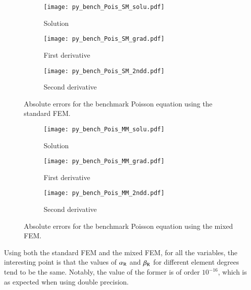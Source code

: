\documentclass[review,3p]{elsarticle}
\begin{document}
\begin{figure}[!ht]
    \begin{subfigure}{5.5cm}
        \texttt{[image: py\_bench\_Pois\_SM\_solu.pdf]}			%
        \caption{Solution}
        \label{py_bench_Pois_SM_solu}
    \end{subfigure}
    \hspace{-0.2cm}
    \begin{subfigure}{5.5cm}
        \texttt{[image: py\_bench\_Pois\_SM\_grad.pdf]}
        \caption{First derivative}
        \label{py_bench_Pois_SM_grad}
    \end{subfigure}
    \hspace{-0.2cm}
    \begin{subfigure}{5.5cm}
        \texttt{[image: py\_bench\_Pois\_SM\_2ndd.pdf]}
        \caption{Second derivative}
        \label{py_bench_Pois_SM_2ndd}
    \end{subfigure}
\caption{Absolute errors for the benchmark Poisson equation using the standard FEM.}
\label{py_bench_Pois_SM}
\end{figure}

\begin{figure}[!ht]
    \begin{subfigure}{5.5cm}
        \texttt{[image: py\_bench\_Pois\_MM\_solu.pdf]}
        \caption{Solution}
        \label{py_bench_Pois_MM_solu}
    \end{subfigure}
    \hspace{-0.2cm}
    \begin{subfigure}{5.5cm}
        \texttt{[image: py\_bench\_Pois\_MM\_grad.pdf]}
        \caption{First derivative}
        \label{py_bench_Pois_MM_grad}
    \end{subfigure}
    \hspace{-0.2cm}
    \begin{subfigure}{5.5cm}
        \texttt{[image: py\_bench\_Pois\_MM\_2ndd.pdf]}
        \caption{Second derivative}
        \label{py_bench_Pois_MM_2ndd}
    \end{subfigure}
\caption{Absolute errors for the benchmark Poisson equation using the mixed FEM.}
\label{py_bench_Pois_MM}
\end{figure}

Using both the standard FEM and the mixed FEM, for all the variables, the interesting point is that the values of $\alpha_{\rm R}$ and $\beta_{\rm R}$ for different element degrees tend to be the same. Notably, the value of the former is of order $10^{-16}$, which is as expected when using double precision.
\end{document}
